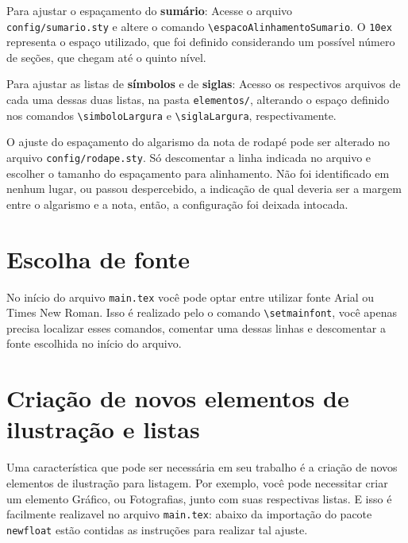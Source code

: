 Para ajustar o espaçamento do \textbf{sumário}: Acesse o arquivo \\\texttt{config/sumario.sty} e altere o comando \verb|\espacoAlinhamentoSumario|. O \texttt{10ex} representa o espaço utilizado, que foi definido considerando um possível número de seções, que chegam até o quinto nível.

Para ajustar as listas de \textbf{símbolos} e de \textbf{siglas}: Acesso os respectivos arquivos de cada uma dessas duas listas, na pasta \texttt{elementos/}, alterando o espaço definido nos comandos \verb|\simboloLargura| e \verb|\siglaLargura|, respectivamente.

O ajuste do espaçamento do algarismo da nota de rodapé pode ser alterado no arquivo \texttt{config/rodape.sty}. Só descomentar a linha indicada no arquivo e escolher o tamanho do espaçamento para alinhamento. Não foi identificado em nenhum lugar, ou passou despercebido, a indicação de qual deveria ser a margem entre o algarismo e a nota, então, a configuração foi deixada intocada.

\section{Escolha de fonte}
No início do arquivo \texttt{main.tex} você pode optar entre utilizar fonte Arial ou Times New Roman. Isso é realizado pelo o comando \verb|\setmainfont|, você apenas precisa localizar esses comandos, comentar uma dessas linhas e descomentar a fonte escolhida no início do arquivo.

\section{Criação de novos elementos de ilustração e listas}\label{section:novos-elementos}
Uma característica que pode ser necessária em seu trabalho é a criação de novos elementos de ilustração para listagem. Por exemplo, você pode necessitar criar um elemento Gráfico, ou Fotografias, junto com suas respectivas listas. E isso é facilmente realizavel no arquivo \texttt{main.tex}: abaixo da importação do pacote \texttt{newfloat} estão contidas as instruções para realizar tal ajuste.

